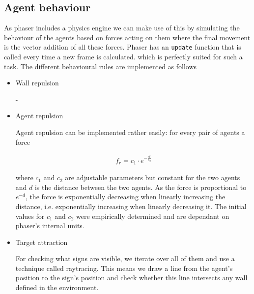 \documentclass[11pt]{article}
\begin{document}
\subsection{Agent behaviour}

As phaser includes a physics engine we can make use of this by simulating the behaviour of the agents based on forces acting on them where the final movement is the vector addition of all these forces. Phaser has an \texttt{update} function that is called every time a new frame is calculated. which is perfectly suited for such a task. The different behavioural rules are implemented as follows

\begin{itemize}
    \item Wall repulsion
    
    -

    \item Agent repulsion
    
    Agent repulsion can be implemented rather easily: for every pair of agents a force
    
    \begin{align*}
    	f_r = c_1 \cdot e^{-\frac{d}{c_2}}
    \end{align*}
    
    where $c_1$ and $c_2$ are adjustable parameters but constant for the two agents and $d$ is the distance between the two agents. As the force is proportional to $e^{-d}$, the force is exponentially decreasing when linearly increasing the distance, i.e. exponentially increasing when linearly decreasing it. The initial values for $c_1$ and $c_2$ were empirically determined and are dependant on phaser's internal units.

%    
%    
%    

    \item Target attraction
    
    For checking what signs are visible, we iterate over all of them and use a technique called raytracing. This means we draw a line from the agent's position to the sign's position and check whether this line intersects any wall defined in the environment.
    

\end{itemize}
\end{document}
